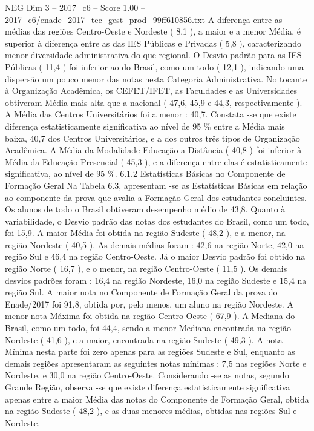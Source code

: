 \begin{textsample}{NEG Dim 3 – 2017\_c6 – Score 1.00 – 2017\_c6/enade\_2017\_tec\_gest\_prod\_99ff610856.txt}
A diferença entre as médias das regiões Centro-Oeste e Nordeste ( 8,1 ), a maior e a menor Média, é superior à diferença entre as das IES Públicas e Privadas ( 5,8 ), caracterizando menor diversidade administrativa do que regional.
O Desvio padrão para as IES Públicas ( 11,4 ) foi inferior ao do Brasil, como um todo ( 12,1 ), indicando uma dispersão um pouco menor das notas nesta Categoria Administrativa.
No tocante à Organização Acadêmica, os CEFET/IFET, as Faculdades e as Universidades obtiveram Média mais alta que a nacional ( 47,6, 45,9 e 44,3, respectivamente ).
A Média das Centros Universitários foi a menor : 40,7.
Constata -se que existe diferença estatisticamente significativa ao nível de 95 \% entre a Média mais baixa, 40,7 dos Centros Universitários, e a dos outros três tipos de Organização Acadêmica.
A Média da Modalidade Educação a Distância ( 40,8 ) foi inferior à Média da Educação Presencial ( 45,3 ), e a diferença entre elas é estatisticamente significativa, ao nível de 95 \%. 6.1.2 Estatísticas Básicas no Componente de Formação Geral Na Tabela 6.3, apresentam -se as Estatísticas Básicas em relação ao componente da prova que avalia a Formação Geral dos estudantes concluintes.
Os alunos de todo o Brasil obtiveram desempenho médio de 43,8.
Quanto à variabilidade, o Desvio padrão das notas dos estudantes do Brasil, como um todo, foi 15,9.
A maior Média foi obtida na região Sudeste ( 48,2 ), e a menor, na região Nordeste ( 40,5 ).
As demais médias foram : 42,6 na região Norte, 42,0 na região Sul e 46,4 na região Centro-Oeste.
Já o maior Desvio padrão foi obtido na região Norte ( 16,7 ), e o menor, na região Centro-Oeste ( 11,5 ).
Os demais desvios padrões foram : 16,4 na região Nordeste, 16,0 na região Sudeste e 15,4 na região Sul.
A maior nota no Componente de Formação Geral da prova do Enade/2017 foi 91,8, obtida por, pelo menos, um aluno na região Nordeste.
A menor nota Máxima foi obtida na região Centro-Oeste ( 67,9 ).
A Mediana do Brasil, como um todo, foi 44,4, sendo a menor Mediana encontrada na região Nordeste ( 41,6 ), e a maior, encontrada na região Sudeste ( 49,3 ).
A nota Mínima nesta parte foi zero apenas para as regiões Sudeste e Sul, enquanto as demais regiões apresentaram as seguintes notas mínimas : 7,5 nas regiões Norte e Nordeste, e 30,0 na região Centro-Oeste.
Considerando -se as notas, segundo Grande Região, observa -se que existe diferença estatisticamente significativa apenas entre a maior Média das notas do Componente de Formação Geral, obtida na região Sudeste ( 48,2 ), e as duas menores médias, obtidas nas regiões Sul e Nordeste.

\end{textsample}
